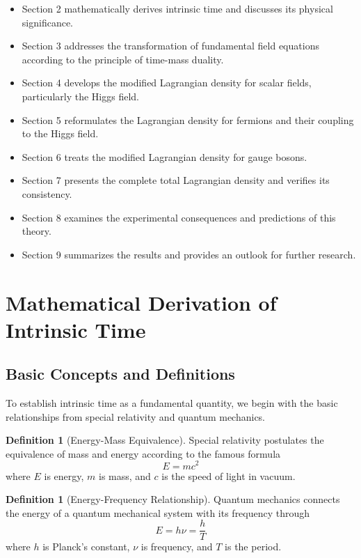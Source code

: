 \documentclass{article}
\theoremstyle{definition}
\newtheorem{definition}[theorem]{Definition}
\theoremstyle{remark}
\begin{document}
	\begin{itemize}
		\item Section 2 mathematically derives intrinsic time and discusses its physical significance.
		\item Section 3 addresses the transformation of fundamental field equations according to the principle of time-mass duality.
		\item Section 4 develops the modified Lagrangian density for scalar fields, particularly the Higgs field.
		\item Section 5 reformulates the Lagrangian density for fermions and their coupling to the Higgs field.
		\item Section 6 treats the modified Lagrangian density for gauge bosons.
		\item Section 7 presents the complete total Lagrangian density and verifies its consistency.
		\item Section 8 examines the experimental consequences and predictions of this theory.
		\item Section 9 summarizes the results and provides an outlook for further research.
	\end{itemize}
	
	\section{Mathematical Derivation of Intrinsic Time}
	
	\subsection{Basic Concepts and Definitions}
	
	To establish intrinsic time as a fundamental quantity, we begin with the basic relationships from special relativity and quantum mechanics.
	
	\begin{definition}[Energy-Mass Equivalence]
		Special relativity postulates the equivalence of mass and energy according to the famous formula
		\begin{equation}
			E = mc^2
		\end{equation}
		where $E$ is energy, $m$ is mass, and $c$ is the speed of light in vacuum.
	\end{definition}
	
	\begin{definition}[Energy-Frequency Relationship]
		Quantum mechanics connects the energy of a quantum mechanical system with its frequency through
		\begin{equation}
			E = h\nu = \frac{h}{T}
		\end{equation}
		where $h$ is Planck's constant, $\nu$ is frequency, and $T$ is the period.
	\end{definition}
	
\end{document}
